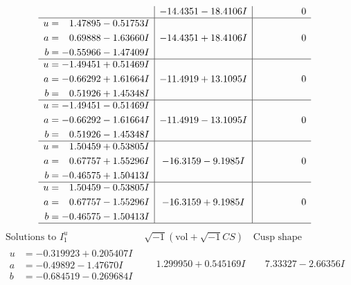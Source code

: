 \documentclass[1p]{elsarticle_modified}
\theoremstyle{definition}
\newcommand{\I}{\sqrt{-1}}
\begin{document}
$$\begin{array}{c|c|c}
 & -14.4351 - 18.4106 I & \phantom{-0.000000 } 0 \\ \hline\begin{aligned}
u &= \phantom{-}1.47895 - 0.51753 I \\
a &= \phantom{-}0.69888 - 1.63660 I \\
b &= -0.55966 - 1.47409 I\end{aligned}
 & -14.4351 + 18.4106 I & \phantom{-0.000000 } 0 \\ \hline\begin{aligned}
u &= -1.49451 + 0.51469 I \\
a &= -0.66292 + 1.61664 I \\
b &= \phantom{-}0.51926 + 1.45348 I\end{aligned}
 & -11.4919 + 13.1095 I & \phantom{-0.000000 } 0 \\ \hline\begin{aligned}
u &= -1.49451 - 0.51469 I \\
a &= -0.66292 - 1.61664 I \\
b &= \phantom{-}0.51926 - 1.45348 I\end{aligned}
 & -11.4919 - 13.1095 I & \phantom{-0.000000 } 0 \\ \hline\begin{aligned}
u &= \phantom{-}1.50459 + 0.53805 I \\
a &= \phantom{-}0.67757 + 1.55296 I \\
b &= -0.46575 + 1.50413 I\end{aligned}
 & -16.3159 - 9.1985 I & \phantom{-0.000000 } 0 \\ \hline\begin{aligned}
u &= \phantom{-}1.50459 - 0.53805 I \\
a &= \phantom{-}0.67757 - 1.55296 I \\
b &= -0.46575 - 1.50413 I\end{aligned}
 & -16.3159 + 9.1985 I & \phantom{-0.000000 } 0\\
 \hline 
 \end{array}$$\newpage$$\begin{array}{c|c|c}  
\text{Solutions to }I^u_{1}& \I (\text{vol} + \sqrt{-1}CS) & \text{Cusp shape}\\
 \hline 
\begin{aligned}
u &= -0.319923 + 0.205407 I \\
a &= -0.49892 - 1.47670 I \\
b &= -0.684519 - 0.269684 I\end{aligned}
 & \phantom{-}1.299950 + 0.545169 I & \phantom{-}7.33327 - 2.66356 I \\ \hline\begin{aligned}

\end{aligned}
\end{array}$$
\end{document}
